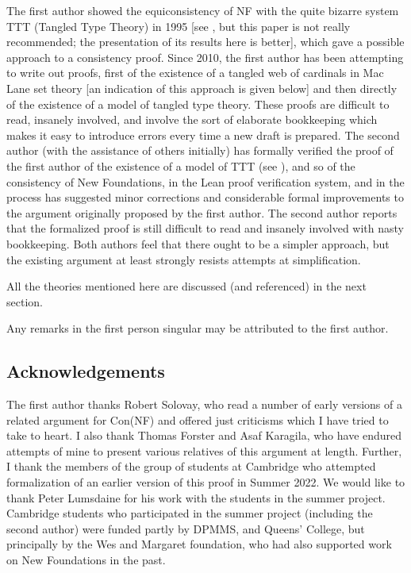 \documentclass[112pt]{article}
\theoremstyle{definition}
\theoremstyle{remark}
\begin{document}
The first author showed the equiconsistency of NF with the quite bizarre system TTT (Tangled Type Theory) in 1995 [see \cite{tangled}, but this paper is not really recommended; the presentation of its results here is better], which gave a possible approach to a consistency proof.  Since 2010, the first author has been attempting to write out proofs, first of the existence of a tangled web of cardinals in Mac Lane set theory [an indication of this approach is given below] and then directly of the existence of a model of tangled type theory.  These proofs are difficult to read, insanely involved, and involve the sort of elaborate bookkeeping which makes it easy to introduce errors every time a new draft is prepared.  The second author (with the assistance of others initially)
has formally verified the proof of the first author of the existence of a model of TTT (see \cite{wilshaw}), and so of the consistency of New Foundations, in the Lean proof verification system, and in the process has suggested minor corrections and considerable formal improvements to the argument originally proposed by the first author.  The second author reports that the formalized proof is still difficult to read and insanely involved with nasty bookkeeping.  Both authors feel that there ought to be a simpler approach, but the existing argument at least strongly resists attempts at simplification.

All the theories mentioned here are discussed (and referenced) in the next section.

Any remarks in the first person singular may be attributed to the first author.

\subsection{Acknowledgements}

The first author thanks Robert Solovay, who read a number of early versions of a related argument for Con(NF) and offered just criticisms which I have tried to take to heart.  I also thank Thomas Forster and Asaf Karagila, who have endured attempts of mine to present various relatives of this argument at length.  Further, I thank the members of the group of students at Cambridge who attempted formalization of an earlier version of this proof in Summer 2022.  We would like to thank Peter Lumsdaine for his work with the students in the summer project.   Cambridge students who participated in the summer project (including the second author) were funded partly by DPMMS, and Queens' College, but principally by the Wes and Margaret foundation, who had also supported work on New Foundations in the past.
\end{document}
